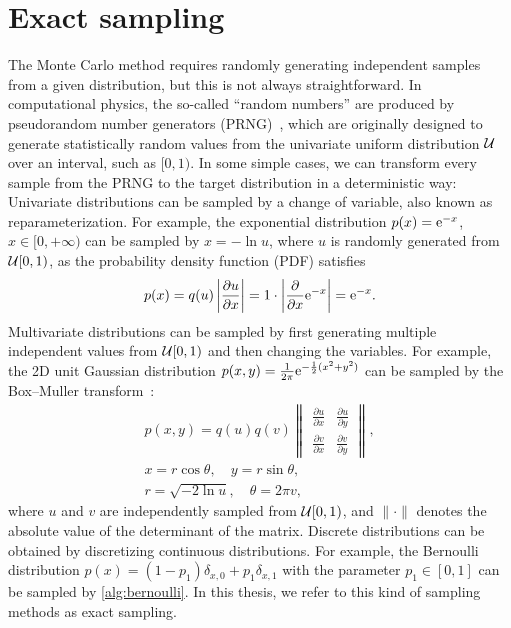 \section{Exact sampling}

The Monte Carlo method requires randomly generating independent samples from a given distribution, but this is not always straightforward. In computational physics, the so-called ``random numbers'' are produced by pseudorandom number generators (PRNG)~\cite{press2007numerical}, which are originally designed to generate statistically random values from the univariate uniform distribution $\mathcal{U}$ over an interval, such as $[0, 1)$. In some simple cases, we can transform every sample from the PRNG to the target distribution in a deterministic way: Univariate distributions can be sampled by a change of variable, also known as reparameterization. For example, the exponential distribution $p(x) = \mathrm{e}^{-x}$, $x \in [0, +\infty)$ can be sampled by $x = -\ln u$, where $u$ is randomly generated from $\mathcal{U}[0, 1)$, as the probability density function (PDF) satisfies
\begin{equation}
p(x) = q(u) \left| \frac{\partial u}{\partial x} \right| = 1 \cdot \left| \frac{\partial}{\partial x} \mathrm{e}^{-x} \right| = \mathrm{e}^{-x}.
\end{equation}
Multivariate distributions can be sampled by first generating multiple independent values from $\mathcal{U}[0, 1)$ and then changing the variables. For example, the 2D unit Gaussian distribution
$p(x, y) = \frac{1}{2 \pi} \mathrm{e}^{-\frac{1}{2} (x^2 + y^2)}$ can be sampled by the Box--Muller transform~\cite{box1958note}:
\begin{gather}
p(x, y) = q(u) q(v) \begin{Vmatrix}
\frac{\partial u}{\partial x} & \frac{\partial u}{\partial y} \\
\frac{\partial v}{\partial x} & \frac{\partial v}{\partial y}
\end{Vmatrix}, \label{eq:reparam} \\
x = r \cos \theta, \quad y = r \sin \theta, \\
r = \sqrt{-2 \ln u}, \quad \theta = 2 \pi v,
\end{gather}
where $u$ and $v$ are independently sampled from $\mathcal{U}[0, 1)$, and $\lVert \cdot \rVert$ denotes the absolute value of the determinant of the matrix. Discrete distributions can be obtained by discretizing continuous distributions. For example, the Bernoulli distribution $p(x) = (1 - p_1) \delta_{x, 0} + p_1 \delta_{x, 1}$ with the parameter $p_1 \in [0, 1]$ can be sampled by \cref{alg:bernoulli}. In this thesis, we refer to this kind of sampling methods as exact sampling.

